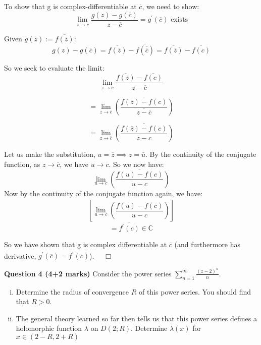 \documentclass[12pt]{article}
\begin{document}
\noindent To show that g is complex-differentiable at \(\overline{c}\), we need to show:
\[
\lim_{z \to \overline{c}} \frac{g(z)-g(\overline{c})}{z-\overline{c}} = g^{\prime}({\overline{c}}) \,\, \text{exists}
\]

\noindent Given \(g(z) := \overline{f(\overline{z})}: \)
\[
g(z) - g(\overline{c}) =  \overline{f(\overline{z})} - \overline{f(\overline{\overline{c}})} = \overline{f(\overline{z})} - \overline{f(c)} 
\]

\noindent So we seek to evaluate the limit:
\[
\lim_{z \to \overline{c}} \frac{\overline{f(\overline{z})} - \overline{f(c)} }{z-\overline{c}}
\]

\[
= \lim_{z \to \overline{c}} \overline{\left(\frac{{f(\overline{z})} - {f(c)} }{\overline{z-\overline{c}}}   \right)}
\]

\[
= \lim_{z \to \overline{c}} \overline{\left(\frac{{f(\overline{z})} - {f(c)} }{\overline{z}- c}   \right)}
\]

\noindent Let us make the substitution, \(u = \overline{z}  \implies z = \overline{u} \). \newline
\linebreak
\noindent By the continuity of the conjugate function, as \(z \to \overline{c}\), we have \(u \to c \).\newline
\linebreak
So we now have:
\[
\lim_{u \to c} \overline{\left(\frac{{f(u)} - {f(c)} }{u- c}   \right)}
\]
\noindent Now by the continuity of the conjugate function again, we have:
\[
\overline{\left[ \lim_{u \to c} {\left(\frac{{f(u)} - {f(c)} }{u- c}   \right)}\right]}
\]
\[
= \overline{f^{\prime}\!\left(c\right)} \in \mathbb{C}
\]

\noindent So we have shown that g is complex differentiable at \(\overline{c}\) (and furthermore has derivative, \(g^{\prime}(\overline{c}) = \overline{f^{\prime}(c)}\)). \(\quad \Box\)\newline
\linebreak

\noindent \textbf{Question 4 (4+2 marks)} Consider the power series \(\sum_{n=1}^{\infty} \frac{\left(z-2\right)^n}{n}\).
\begin{enumerate}[(i)]
    \item Determine the radius of convergence \(R\) of this power series. You should find that \(R > 0\).
    \item The general theory learned so far then tells us that this power series defines a holomorphic function \( \lambda \) on \(D(2;R)\). Determine \(\lambda(x)\) for \(x \in \left(2-R, 2 + R\right)\)
\end{enumerate}
\end{document}
